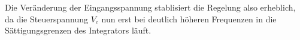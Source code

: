\documentclass[../main_config.tex]{subfiles}
\begin{document}
\medskip

\medskip

Die Veränderung der Eingangsspannung stablisiert die Regelung also erheblich, da die Steuerspannung $V_c$ nun erst bei deutlich höheren Frequenzen in die Sättigungsgrenzen des Integrators läuft.

\end{document}
